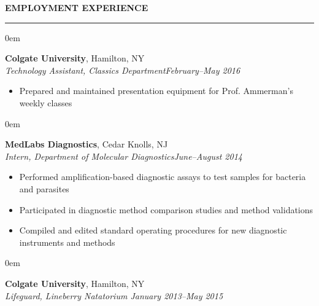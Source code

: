 \documentclass[11pt, letterpaper]{article}
\newenvironment{CVSection}{
\begin{addmargin}[2em]{0em}
\begin{samepage}}
{\end{samepage}
\end{addmargin}\bigskip}
\newcommand{\CVHeading}[1]{
\MakeUppercase{\bf #1}
\smallskip
\hrule
\medskip
}
\begin{document}
\CVHeading{Employment Experience}
\begin{CVSection}
\textbf{Colgate University}, Hamilton, NY\\
\textsl{Technology Assistant, Classics Department\hfill  February--May 2016}
\begin{itemize}
\item Prepared and maintained presentation equipment for Prof. Ammerman’s weekly classes
\end{itemize}
\end{CVSection}
\begin{CVSection}
\textbf{MedLabs Diagnostics}, Cedar Knolls, NJ\\
\textsl{Intern, Department of Molecular Diagnostics\hfill June--August 2014}
\begin{itemize}
\item Performed amplification-based diagnostic assays to test samples for bacteria and parasites
\item Participated in diagnostic method comparison studies and method validations
\item Compiled and edited standard operating procedures for new diagnostic instruments and methods
\end{itemize}
\end{CVSection}
\begin{CVSection}
\textbf{Colgate University}, Hamilton, NY\\
\textsl{Lifeguard, Lineberry Natatorium \hfill January 2013--May 2015}
\end{CVSection}
\end{document}
